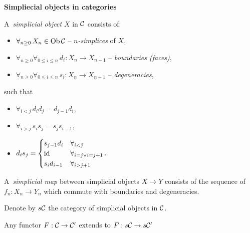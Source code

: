 



    {\bf Simpliecial objects in categories}
    
    \begin{definition}
        A~{\em simplicial object} $X$ in $\mathcal{C}$ consists of:
        \begin{itemize}
            \item $\forall_{n \geq 0}\, X_n \in\operatorname{Ob}\mathcal{C}$ 
            -- {\em $n$-simplices} of $X$,
            \item $\forall_{n \geq 0} \forall_{0 \leq i \leq n}\,
            d_i : X_n \to X_{n-1}$ -- {\em boundaries (faces)},
            \item $\forall_{n \geq 0} \forall_{0 \leq i \leq n}\,
            s_i : X_n \to X_{n+1}$ -- {\em degeneracies},
        \end{itemize}
        such that
        \begin{itemize}
            \item $\forall_{i<j}\, d_i d_j = d_{j-1} d_i$,
            \item $\forall_{i>j}\, s_i s_j = s_j s_{i-1}$,
            \item $d_i s_j =
            \begin{cases}
                s_{j-1} d_i & \forall_{i<j} \\
                \mathrm{id} & \forall_{i=j \vee i=j+1} \\
                s_i d_{i-1} & \forall_{i>j+1}
            \end{cases}$.
        \end{itemize}
    \end{definition}
    
    \begin{definition}
        A~{\em simplicial map} between simplicial objects
        $X \to Y$ consists of the sequence of $f_n:X_n \to Y_n$
        which commute with boundaries and degeneracies.
    \end{definition}
    
    \begin{definition}
        Denote by $s\mathcal{C}$ the category of simplicial objects in $\mathcal{C}$.
    \end{definition}
    
    \begin{remark}
        Any functor $F:\mathcal{C} \to \mathcal{C}'$ extends to $F:s\mathcal{C} \to s\mathcal{C}'$
    \end{remark}
    
